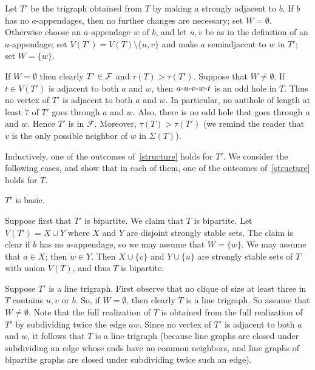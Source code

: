 \documentclass[11 pt] {article}
\def\d{\hbox{-}}
\newcounter{claim}
\begin{document}
Let $T'$ be the trigraph obtained from $T$ by making $a$ strongly
adjacent to $b$. If $b$ has no $a$-appendages, then no further changes
are necessary; set $W=\emptyset$. Otherwise choose an $a$-appendage
$w$ of $b$, and let $u,v$ be as in the definition of an $a$-appendage;
set $V(T')=V(T) \setminus \{u,v\}$ and make $a$ semiadjacent to $w$
in $T'$; set $W=\{w\}$.

If $W=\emptyset$ then clearly $T'\in {\cal F}$ and $\tau (T)> \tau
(T')$. Suppose that $W\neq \emptyset$. If $t \in V(T')$ is adjacent to
both $a$ and $w$, then $a \d u \d v \d w \d t$ is an odd hole in
$T$. Thus no vertex of $T'$ is adjacent to both $a$ and $w$. In
particular, no antihole of length at least $7$ of $T'$ goes through
$a$ and $w$.  Also, there is no odd hole that goes through $a$ and
$w$.  Hence $T'$ is in $\mathcal{F}$. Moreover, $\tau(T)>\tau(T')$ (we
remind the reader that $v$ is the only possible neighbor of $w$ in
$\Sigma(T)$).

Inductively, one of the outcomes of~\ref{structure} holds for $T'$.
We consider the following cases, and show that in each of them, one of
the outcomes of~\ref{structure} holds for $T$.

 $T'$ is basic.

Suppose first that $T'$ is bipartite.  We claim that $T$ is bipartite.
Let $V(T')=X \cup Y$ where $X$ and $Y$ are disjoint strongly stable
sets. The claim is clear if $b$ has no $a$-appendage, so we may
assume that $W=\{w\}$. We may assume that $a \in X$; then $w \in
Y$. Then $X \cup \{v\}$ and $Y \cup \{u\}$ are strongly stable sets of
$T$ with union $V(T)$, and thus $T$ is bipartite.

Suppose $T'$ is a line trigraph.  First observe that no clique of size
at least three in $T$ contains $u,v$ or $b$. So, if $W=\emptyset$,
then clearly $T$ is a line trigraph. So assume that $W\neq
\emptyset$. Note that the full realization of $T$ is obtained from the
full realization of $T'$ by subdividing twice the edge $aw$. Since no
vertex of $T'$ is adjacent to both $a$ and $w$, it follows that $T$ is a
line trigraph (because line graphs are closed under subdividing an
edge whose ends have no common neighbors, and line graphs of bipartite
graphs are closed under subdividing twice such an edge).
\end{document}

